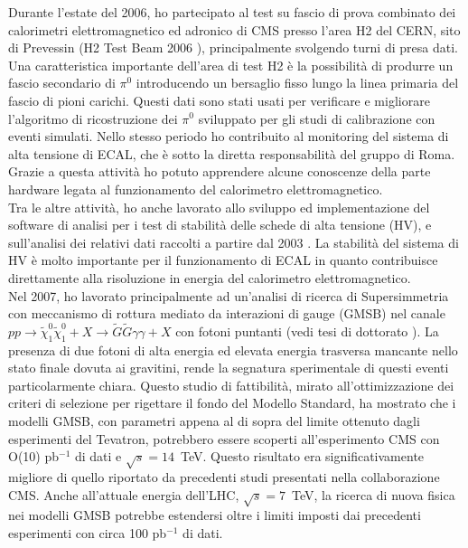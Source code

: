 \documentclass[10pt, a4paper]{article}
\begin{document}
Durante l'estate del 2006, ho partecipato al test su fascio di prova combinato dei calorimetri elettromagnetico 
ed adronico di CMS presso l'area H2 del CERN, sito di Prevessin (H2 Test Beam 2006 \cite{Abdullin:2009zz}), 
principalmente svolgendo turni di presa dati.
Una caratteristica importante dell'area di test H2 \`e la possibilit\`a di produrre un fascio secondario di $\pi^0$ 
introducendo un bersaglio fisso lungo la linea primaria del fascio di pioni carichi. Questi dati \cite{Adzic:2008zza} 
sono stati usati per verificare e migliorare l'algoritmo di ricostruzione dei $\pi^0$ sviluppato per gli studi di calibrazione 
con eventi simulati. Nello stesso periodo ho contribuito al monitoring del sistema di alta 
tensione di ECAL, che \`e sotto la diretta responsabilit\`a del gruppo di Roma. Grazie a questa attivit\`a ho potuto apprendere 
alcune conoscenze della parte hardware legata al funzionamento del calorimetro elettromagnetico. \\

Tra le altre attivit\`a, ho anche lavorato allo sviluppo ed implementazione del software di analisi per i test di stabilit\`a delle schede 
di alta tensione (HV), e sull'analisi dei relativi dati raccolti a partire dal 2003 \cite{Bartoloni:2007hx}. 
La stabilit\`a del sistema di HV \`e molto importante per il funzionamento di ECAL in quanto contribuisce 
direttamente alla risoluzione in energia del calorimetro elettromagnetico. \\

Nel 2007, ho lavorato principalmente ad un'analisi di ricerca di Supersimmetria con meccanismo di rottura mediato da 
interazioni di gauge (GMSB) nel canale 
$pp \rightarrow \tilde{\chi}_1^0 \tilde{\chi}_1^0 + X \rightarrow \tilde{G} \tilde{G} \gamma \gamma + X$  con fotoni puntanti  
(vedi tesi di dottorato \cite{Santanastasio:DOTTORATO}). 
La presenza di due fotoni di alta energia ed elevata energia trasversa mancante nello stato finale dovuta ai gravitini, 
rende la segnatura sperimentale di questi eventi particolarmente chiara. Questo studio di fattibilit\`a, mirato all'ottimizzazione 
dei criteri di selezione per rigettare il fondo del Modello Standard, ha mostrato che i modelli GMSB, con parametri appena al 
di sopra del limite ottenuto dagli esperimenti del Tevatron, potrebbero essere scoperti all'esperimento CMS 
con O(10) pb$^{-1}$ di dati e $\sqrt{s}=14$~TeV. Questo risultato era significativamente migliore di quello riportato da precedenti 
studi presentati nella collaborazione CMS. Anche all'attuale energia dell'LHC, $\sqrt{s}=7$~TeV, la ricerca di nuova fisica 
nei modelli GMSB potrebbe estendersi oltre i limiti imposti dai precedenti esperimenti con circa 100 pb$^{-1}$ di dati. \\
\end{document}

